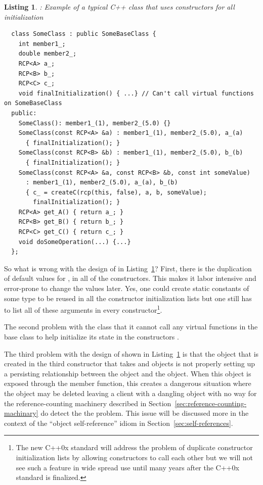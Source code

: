 \documentclass[pdf,ps2pdf,11pt]{SANDreport}
\newtheorem{listing}{Listing}
\begin{document}
\begin{listing}: Example of a typical C++ class that uses constructors for all
initialization  \\
\label{listing:sci:SomeClass-before}
{\small\begin{verbatim}
  class SomeClass : public SomeBaseClass {
    int member1_;
    double member2_;
    RCP<A> a_;
    RCP<B> b_;
    RCP<C> c_;
    void finalInitialization() { ...} // Can't call virtual functions on SomeBaseClass
  public:
    SomeClass(): member1_(1), member2_(5.0) {}
    SomeClass(const RCP<A> &a) : member1_(1), member2_(5.0), a_(a)
      { finalInitialization(); }
    SomeClass(const RCP<B> &b) : member1_(1), member2_(5.0), b_(b)
      { finalInitialization(); }
    SomeClass(const RCP<A> &a, const RCP<B> &b, const int someValue)
      : member1_(1), member2_(5.0), a_(a), b_(b)
      { c_ = createC(rcp(this, false), a, b, someValue);
        finalInitialization(); }
    RCP<A> get_A() { return a_; }
    RCP<B> get_B() { return b_; }
    RCP<C> get_C() { return c_; }
    void doSomeOperation(...) {...}
  };

\end{verbatim}}
\end{listing}


So what is wrong with the design of {} in
Listing~\ref{listing:sci:SomeClass-before}?  First, there is the
duplication of default values for {}, {}
in all of the constructors.  This makes it labor intensive and
error-prone to change the values later.  Yes, one could create static
constants of some type to be reused in all the constructor
initialization lists but one still has to list all of these arguments
in every constructor\footnote{The new C++0x standard will address the
problem of duplicate constructor initialization lists by allowing
constructors to call each other but we will not see such a feature in
wide spread use until many years after the C++0x standard is
finalized.}.

The second problem with the class {} that it cannot
call any virtual functions in the base class {} to
help initialize its state in the constructors {}\cite[Item
49]{C++CodingStandards05}.

The third problem with the design of {} shown in
Listing~\ref{listing:sci:SomeClass-before} is that the {}
object that is created in the third constructor that takes {}
and {} objects is not properly setting up a persisting
relationship between the {} object and the {}
object.  When this {} object is exposed through the
{} member function, this creates a dangerous situation
where the {} object may be deleted leaving a client
with a dangling {} object with no way for the
reference-counting machinery described in
Section~\ref{sec:reference-counting-machinary} do detect the the
problem.  This issue will be discussed more in the context of the
``object self-reference'' idiom in Section~\ref{sec:self-references}.
\end{document}
